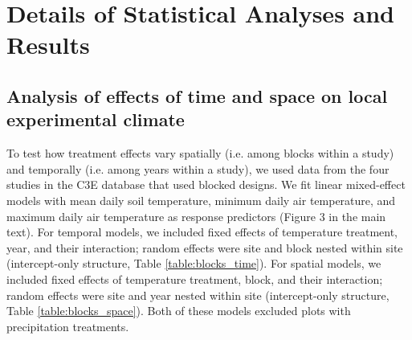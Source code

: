 \documentclass{article}
\begin{document}
\section* {Details of Statistical Analyses and Results}
\subsection* {Analysis of effects of time and space on local experimental climate}
To test how treatment effects vary spatially (i.e. among blocks within a study) and temporally (i.e. among years within a study), we used data from the four studies in the C3E database that used blocked designs. We fit linear mixed-effect models with mean daily soil temperature, minimum daily air temperature, and maximum daily air temperature as response predictors (Figure 3 in the main text). For temporal models, we included fixed effects of temperature treatment, year, and their interaction; random effects were site and block nested within site (intercept-only structure, Table \ref{table:blocks_time}). For spatial models, we included fixed effects of temperature treatment, block, and their interaction; random effects were site and year nested within site (intercept-only structure, Table \ref{table:blocks_space}). Both of these models excluded plots with precipitation treatments. 
\end{document}

